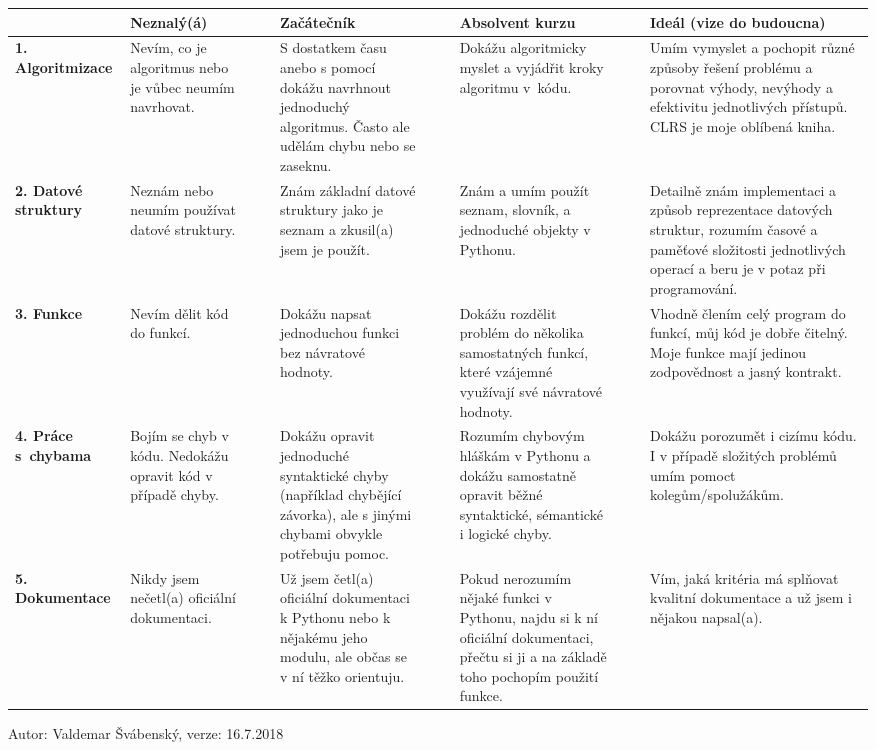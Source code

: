\documentclass{article}
\begin{document}
\begin{table}[H]
\centering
\begin{tabular}{|l|p{2.5cm}|l|l|p{4.5cm}|l|l|p{4.5cm}|l|l|p{4.5cm}|}
\hline
& \textbf{Neznalý(á)} & & & \textbf{Začátečník} & & & \textbf{Absolvent kurzu} & & & \textbf{Ideál (vize do budoucna)} \\ \hline

\textbf{1. Algoritmizace}
& Nevím, co je algoritmus nebo je vůbec neumím navrhovat. & &
& S dostatkem času anebo s pomocí dokážu navrhnout jednoduchý algoritmus. Často ale udělám chybu nebo se zaseknu. & & 
& Dokážu algoritmicky myslet a vyjádřit kroky algoritmu v~kódu. & & 
& Umím vymyslet a pochopit různé způsoby řešení problému a porovnat výhody, nevýhody a efektivitu jednotlivých přístupů. CLRS je moje oblíbená kniha. \\ \hline

\textbf{2. Datové struktury}
& Neznám nebo neumím používat datové struktury. & &
& Znám základní datové struktury jako je seznam a zkusil(a) jsem je použít. & & 
& Znám a umím použít seznam, slovník, a jednoduché objekty v Pythonu. & & 
& Detailně znám implementaci a způsob reprezentace datových struktur, rozumím časové a paměťové složitosti jednotlivých operací a beru je v potaz při programování. \\ \hline

\textbf{3. Funkce}
& Nevím dělit kód do funkcí. & &
& Dokážu napsat jednoduchou funkci bez návratové hodnoty. & & 
& Dokážu rozdělit problém do několika samostatných funkcí, které vzájemné využívají své návratové hodnoty. & & 
& Vhodně člením celý program do funkcí, můj kód je dobře čitelný. Moje funkce mají jedinou zodpovědnost a jasný kontrakt. \\ \hline

\textbf{4. Práce s~chybama}
& Bojím se chyb v kódu. Nedokážu opravit kód v případě chyby. & &
& Dokážu opravit jednoduché syntaktické chyby (například chybějící závorka), ale s jinými chybami obvykle potřebuju pomoc. & & 
& Rozumím chybovým hláškám v Pythonu a dokážu samostatně opravit běžné syntaktické, sémantické i logické chyby. & & 
& Dokážu porozumět i cizímu kódu. I v případě složitých problémů umím pomoct kolegům/spolužákům. \\ \hline

\textbf{5. Dokumentace}
& Nikdy jsem nečetl(a) oficiální dokumentaci. & &
& Už jsem četl(a) oficiální dokumentaci k Pythonu nebo k nějakému jeho modulu, ale občas se v ní těžko orientuju. & & 
& Pokud nerozumím nějaké funkci v Pythonu, najdu si k ní oficiální dokumentaci, přečtu si ji a na základě toho pochopím použití funkce. & & 
& Vím, jaká kritéria má splňovat kvalitní dokumentace a už jsem i nějakou napsal(a). \\ \hline
\end{tabular}
\end{table}

\begin{center}
\small Autor: Valdemar Švábenský, verze: 16.7.2018
\end{center}
\end{document}
